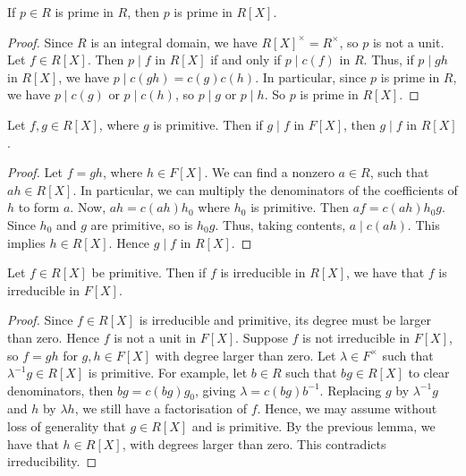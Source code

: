 \begin{corollary}
	If \( p \in R \) is prime in \( R \), then \( p \) is prime in \( R[X] \).
\end{corollary}
\begin{proof}
	Since \( R \) is an integral domain, we have \( R[X]^\times = R^\times \), so \( p \) is not a unit.
	Let \( f \in R[X] \).
	Then \( p \mid f \) in \( R[X] \) if and only if \( p \mid c(f) \) in \( R \).
	Thus, if \( p \mid gh \) in \( R[X] \), we have \( p \mid c(gh) = c(g) c(h) \).
	In particular, since \( p \) is prime in \( R \), we have \( p \mid c(g) \) or \( p \mid c(h) \), so \( p \mid g \) or \( p \mid h \).
	So \( p \) is prime in \( R[X] \).
\end{proof}
\begin{lemma}
	Let \( f,g \in R[X] \), where \( g \) is primitive.
	Then if \( g \mid f \) in \( F[X] \), then \( g \mid f \) in \( R[X] \).
\end{lemma}
\begin{proof}
	Let \( f = gh \), where \( h \in F[X] \).
	We can find a nonzero \( a \in R \), such that \( ah \in R[X] \).
	In particular, we can multiply the denominators of the coefficients of \( h \) to form \( a \).
	Now, \( ah = c(ah) h_0 \) where \( h_0 \) is primitive.
	Then \( af = c(ah) h_0 g \).
	Since \( h_0 \) and \( g \) are primitive, so is \( h_0 g \).
	Thus, taking contents, \( a \mid c(ah) \).
	This implies \( h \in R[X] \).
	Hence \( g \mid f \) in \( R[X] \).
\end{proof}
\begin{lemma}
	Let \( f \in R[X] \) be primitive.
	Then if \( f \) is irreducible in \( R[X] \), we have that \( f \) is irreducible in \( F[X] \).
\end{lemma}
\begin{proof}
	Since \( f \in R[X] \) is irreducible and primitive, its degree must be larger than zero.
	Hence \( f \) is not a unit in \( F[X] \).
	Suppose \( f \) is not irreducible in \( F[X] \), so \( f = gh \) for \( g,h \in F[X] \) with degree larger than zero.
	Let \( \lambda \in F^\times \) such that \( \lambda^{-1} g \in R[X] \) is primitive.
	For example, let \( b \in R \) such that \( bg \in R[X] \) to clear denominators, then \( bg = c(bg) g_0 \), giving \( \lambda = c(bg) b^{-1} \).
	Replacing \( g \) by \( \lambda^{-1} g \) and \( h \) by \( \lambda h \), we still have a factorisation of \( f \).
	Hence, we may assume without loss of generality that \( g \in R[X] \) and is primitive.
	By the previous lemma, we have that \( h \in R[X] \), with degrees larger than zero.
	This contradicts irreducibility.
\end{proof}

